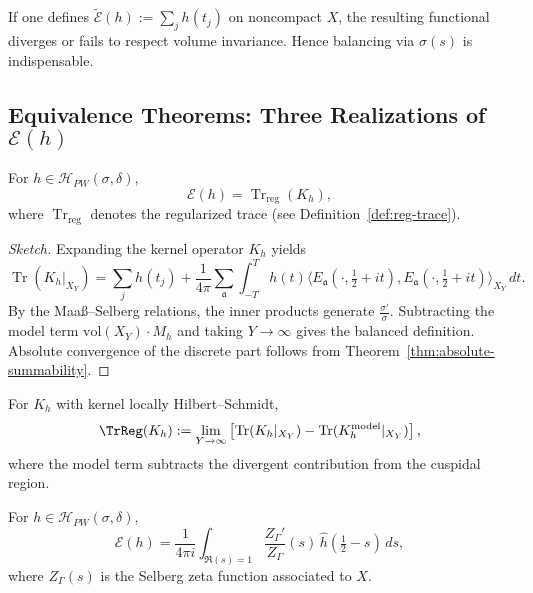 \begin{counterexample}
If one defines $\widetilde{\mathcal{E}}(h) := \sum_j h(t_j)$ on noncompact $X$, the resulting functional diverges or fails to respect volume invariance. Hence balancing via $\sigma(s)$ is indispensable.
\end{counterexample}

\subsection{Equivalence Theorems: Three Realizations of $\mathcal{E}(h)$}

\begin{theorem}
\label{thm:E1-E2}
For $h \in \mathcal{H}_{PW}(\sigma,\delta)$,
\[
\mathcal{E}(h) = \operatorname{Tr}_{\mathrm{reg}}(K_h),
\]
where $\operatorname{Tr}_{\mathrm{reg}}$ denotes the regularized trace (see Definition~\ref{def:reg-trace}).
\end{theorem}

\begin{proof}[Sketch]
Expanding the kernel operator $K_h$ yields
\[
\operatorname{Tr}(K_h|_{X_Y}) = \sum_j h(t_j) + \frac{1}{4\pi}\sum_{\mathfrak{a}} \int_{-T}^T h(t) \langle E_{\mathfrak{a}}(\cdot,\tfrac{1}{2}+it), E_{\mathfrak{a}}(\cdot,\tfrac{1}{2}+it)\rangle_{X_Y}\,dt.
\]
By the Maaß–Selberg relations, the inner products generate $\tfrac{\sigma'}{\sigma}$. Subtracting the model term $\mathrm{vol}(X_Y)\cdot M_h$ and taking $Y \to \infty$ gives the balanced definition. Absolute convergence of the discrete part follows from Theorem~\ref{thm:absolute-summability}.
\end{proof}

\begin{definition}
\label{def:reg-trace}
For $K_h$ with kernel locally Hilbert–Schmidt,
\[
\TrReg(K_h) := \lim_{Y \to \infty} \left[ \operatorname{Tr}(K_h|_{X_Y}) - \operatorname{Tr}(K_h^{\mathrm{model}}|_{X_Y}) \right],
\]
where the model term subtracts the divergent contribution from the cuspidal region.
\end{definition}

\begin{theorem}
\label{thm:E1-E3}
For $h \in \mathcal{H}_{PW}(\sigma,\delta)$,
\[
\mathcal{E}(h) = \frac{1}{4\pi i}\int_{\Re(s)=1}\frac{Z_\Gamma'}{Z_\Gamma}(s)\,\widehat{h}\!\left(\tfrac{1}{2}-s\right)\,ds,
\]
where $Z_\Gamma(s)$ is the Selberg zeta function associated to $X$.
\end{theorem}


